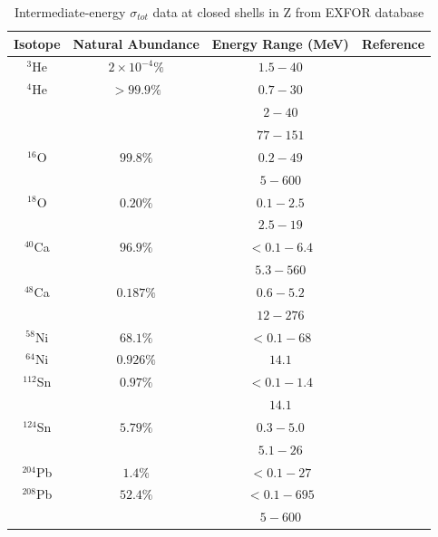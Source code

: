 \documentclass[twocolumn,secnumarabic,amssymb, nobibnotes, aps, prl,
superscriptaddress, nobalancelastpage]{revtex4}
\begin{document}
\begin{table}[ht]
    \caption{Intermediate-energy $\sigma_{tot}$ data at closed shells in Z from
    EXFOR database}
    \label{IsotopicCrossSectionTable}
    \begin{center}
        \begin{tabular}{ c c c c }
            \hline
            Isotope & Natural Abundance & Energy Range (MeV) & Reference\\
            \hline

            $^{3}$He & $2\times 10^{-4}\%$ & $1.5 - 40$ & \cite{Haesner1983}\\
            $^{4}$He & $>99.9\%$ & $0.7-30$ & \cite{Goulding1973}\\
            & & $2-40$ & \cite{Haesner1983}\\
            & & $77-151$ & \cite{Measday1966}\\

            $^{16}$O & $99.8\%$ & $0.2-49$ & \cite{Perey1972}\\
            & & $5-600$ & \cite{Finlay1993}\\

            $^{18}$O & $0.20\%$ & $0.1-2.5$ & \cite{Vaughn1965}\\
            & & $2.5-19$ & \cite{Salisbury1965}\\

            $^{40}$Ca & $96.9\%$ & $<0.1-6.4$ & \cite{Johnson1973}\\
            & & $5.3-560$ & \cite{Abfalterer2001}\\

            $^{48}$Ca & $0.187\%$ & $0.6-5.2$ & \cite{Harvey1985}\\
            & & $12-276$ & \cite{Shane2010}\\

            $^{58}$Ni & $68.1\%$ & $<0.1-68$ & \cite{Perey1993}\\

            $^{64}$Ni & $0.926\%$ & $14.1$ & \cite{Dukarevich1967}\\

            $^{112}$Sn & $0.97\%$ & $<0.1-1.4$ & \cite{Timokhov1989}\\
            & & $14.1$ & \cite{Dukarevich1967}\\

            $^{124}$Sn & $5.79\%$ & $0.3-5.0$ & \cite{Harper1982}\\
            & & $5.1-26$ & \cite{Rapaport1980}\\

            $^{204}$Pb & $1.4\%$ & $<0.1-27$ & \cite{Carlton2003}\\

            $^{208}$Pb & $52.4\%$ & $<0.1 - 695$ & \cite{Harvey1999}\\
            & & $5-600$ & \cite{Finlay1993}\\

            \hline
        \end{tabular}
    \end{center}
\end{table}
\end{document}
